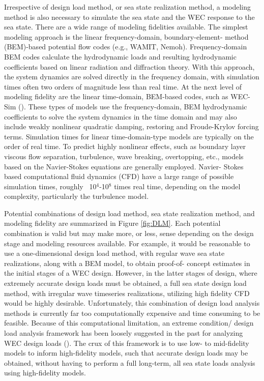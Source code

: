 Irrespective of design load method, or sea state realization method, a modeling method is also necessary to simulate the sea state and the WEC response to the sea state. There are a wide range of modeling fidelities available. The simplest modeling approach is the linear frequency-domain, boundary-element- method (BEM)-based potential flow codes (e.g., WAMIT, Nemoh). Frequency-domain BEM codes calculate the hydrodynamic loads and resulting hydrodynamic coefficients based on linear radiation and diffraction theory. With this approach, the system dynamics are solved directly in the frequency domain, with simulation times often two orders of magnitude less than real time. At the next level of modeling fidelity are the linear time-domain, BEM-based codes, such as WEC-Sim (\cite{Yu2014a,Ruehl2014}). These types of models use the frequency-domain, BEM hydrodynamic coefficients to solve the system dynamics in the time domain and may also include weakly nonlinear quadratic damping, restoring and Froude-Krylov forcing terms. Simulation times for linear time-domain-type models are typically on the order of real time. To predict highly nonlinear effects, such as boundary layer viscous flow separation, turbulence, wave breaking, overtopping, etc., models based on the Navier-Stokes equations are generally employed. Navier- Stokes based computational fluid dynamics (CFD) have a large range of possible simulation times, roughly ~10$^4$-10$^8$ times real time, depending on the model complexity, particularly the turbulence model.

Potential combinations of design load method, sea state realization method, and modeling fidelity are summarized in Figure \ref{fig:DLM}. Each potential combination is valid but may make more, or less, sense depending on the design stage and modeling resources available. For example, it would be reasonable to use a one-dimensional design load method, with regular wave sea state realizations, along with a BEM model, to obtain proof-of- concept estimates in the initial stages of a WEC design. However, in the latter stages of design, where extremely accurate design loads must be obtained, a full sea state design load method, with irregular wave timeseries realizations, utilizing high fidelity CFD would be highly desirable. Unfortunately, this combination of design load analysis methods is currently far too computationally expensive and time consuming to be feasible. Because of this computational limitation, an extreme condition/ design load analysis framework has been loosely suggested in the past for analyzing WEC design loads (\cite{Quon2016,VanRij2017,Coe2016,VanRij2017a}). The crux of this framework is to use low- to mid-fidelity models to inform high-fidelity models, such that accurate design loads may be obtained, without having to perform a full long-term, all sea state loads analysis using high-fidelity models.

